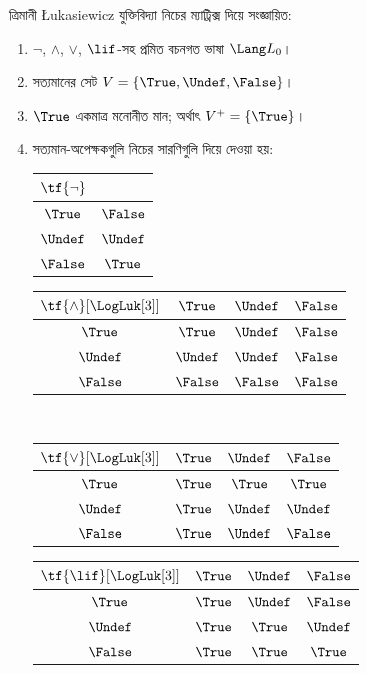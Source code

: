 \documentclass[../../../include/open-logic-section]{subfiles}
\begin{document}
\begin{defn}
ত্রিমানী \L ukasiewicz যুক্তিবিদ্যা নিচের ম্যাট্রিক্স দিয়ে সংজ্ঞায়িত:
\begin{enumerate}
  \item $\lnot$, $\land$, $\lor$, $\lif$-সহ প্রমিত বচনগত ভাষা
  $\Lang L_0$।
  \item সত্যমানের সেট $V = \{\True, \Undef, \False\}$।
  \item $\True$ একমাত্র মনোনীত মান; অর্থাৎ $V^+ = \{\True\}$।
  \item সত্যমান-অপেক্ষকগুলি নিচের সারণিগুলি দিয়ে দেওয়া হয়:
  \begin{center}
    \begin{tabular}{c|c}
      $\tf{\lnot}$ & \\
      \hline
      $\True$ & $\False$ \\
      $\Undef$ & $\Undef$ \\
      $\False$ & $\True$
    \end{tabular}
    \quad
    \begin{tabular}{c|ccc}
      $\tf{\land}[\LogLuk[3]]$ & $\True$ & $\Undef$ & $\False$ \\
      \hline
      $\True$ & $\True$ & $\Undef$ & $\False$ \\
      $\Undef$ & $\Undef$ & $\Undef$ & $\False$\\
      $\False$ & $\False$ & $\False$ & $\False$
    \end{tabular}
    \\[2ex]
    \begin{tabular}{c|ccc}
      $\tf{\lor}[\LogLuk[3]]$ & $\True$ & $\Undef$ & $\False$ \\
      \hline
      $\True$ & $\True$ & $\True$ & $\True$ \\
      $\Undef$ & $\True$ & $\Undef$ & $\Undef$ \\
      $\False$ & $\True$ & $\Undef$ & $\False$
    \end{tabular}
    \quad
    \begin{tabular}{c|ccc}
      $\tf{\lif}[\LogLuk[3]]$ & $\True$ & $\Undef$ & $\False$ \\
      \hline
      $\True$ & $\True$ & $\Undef$ & $\False$ \\
      $\Undef$ & $\True$ & $\True$ & $\Undef$  \\
      $\False$ & $\True$ & $\True$ & $\True$
    \end{tabular}
  \end{center}
\end{enumerate}
\end{defn}
\end{document}
